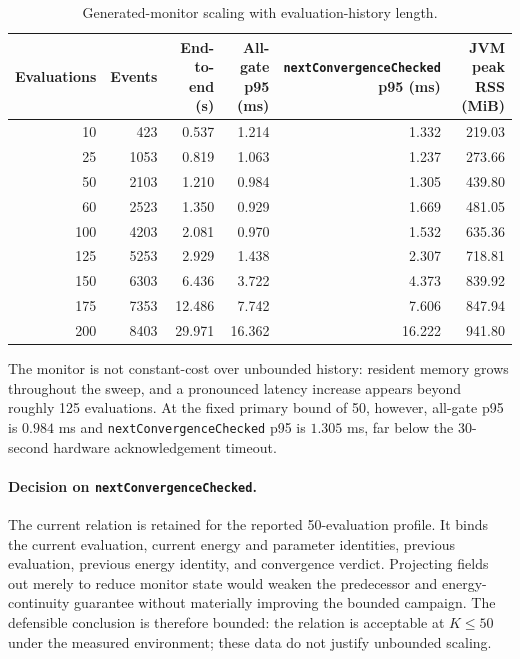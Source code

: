 \begin{table}[t]
  \centering
  \caption{Generated-monitor scaling with evaluation-history length.}
  \label{tab:rv-scaling}
  \renewcommand{\arraystretch}{1.08}
  \begin{tabular}{rrrrrr}
    \toprule
    Evaluations & Events & \shortstack{End-to-end\\(s)}
      & \shortstack{All-gate\\p95 (ms)}
      & \shortstack{\texttt{nextConvergenceChecked}\\p95 (ms)}
      & \shortstack{JVM peak RSS\\(MiB)} \\
    \midrule
     10 &  423 &  0.537 &  1.214 &  1.332 & 219.03 \\
     25 & 1053 &  0.819 &  1.063 &  1.237 & 273.66 \\
     50 & 2103 &  1.210 &  0.984 &  1.305 & 439.80 \\
     60 & 2523 &  1.350 &  0.929 &  1.669 & 481.05 \\
    100 & 4203 &  2.081 &  0.970 &  1.532 & 635.36 \\
    125 & 5253 &  2.929 &  1.438 &  2.307 & 718.81 \\
    150 & 6303 &  6.436 &  3.722 &  4.373 & 839.92 \\
    175 & 7353 & 12.486 &  7.742 &  7.606 & 847.94 \\
    200 & 8403 & 29.971 & 16.362 & 16.222 & 941.80 \\
    \bottomrule
  \end{tabular}
\end{table}

The monitor is not constant-cost over unbounded history: resident memory grows
throughout the sweep, and a pronounced latency increase appears beyond roughly
125 evaluations.  At the fixed primary bound of 50, however, all-gate p95 is
$0.984$ ms and \texttt{nextConvergenceChecked} p95 is $1.305$ ms, far below
the 30-second hardware acknowledgement timeout.

\paragraph{Decision on \texttt{nextConvergenceChecked}.}
The current relation is retained for the reported 50-evaluation profile.  It
binds the current evaluation, current energy and parameter identities, previous
evaluation, previous energy identity, and convergence verdict.  Projecting
fields out merely to reduce monitor state would weaken the predecessor and
energy-continuity guarantee without materially improving the bounded campaign.
The defensible conclusion is therefore bounded: the relation is acceptable at
$K\le 50$ under the measured environment; these data do not justify unbounded
scaling.

